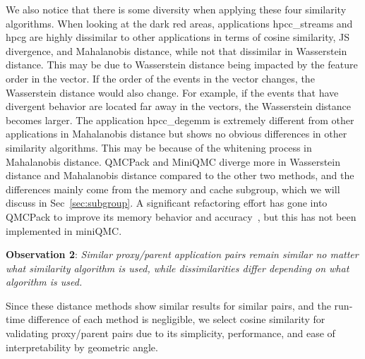 We also notice that there is some diversity when applying these four similarity algorithms. When looking at the dark red areas, applications hpcc\_streams and hpcg are highly dissimilar to other applications in terms of cosine similarity, JS divergence, and Mahalanobis distance, while not that dissimilar in Wasserstein distance. This may be due to Wasserstein distance being impacted by the feature order in the vector. If the order of the events in the vector changes, the Wasserstein distance would also change. For example, if the events that have divergent behavior are located far away in the vectors, the Wasserstein distance becomes larger. The application hpcc\_degemm is extremely different from other applications in Mahalanobis distance but shows no obvious differences in other similarity algorithms. This may be because of the whitening process in Mahalanobis distance. QMCPack and MiniQMC diverge more in Wasserstein distance and Mahalanobis distance compared to the other two methods, and the differences mainly come from the memory and cache subgroup, which we will discuss in Sec~\ref{sec:subgroup}. A significant refactoring effort has gone into QMCPack to improve its memory
behavior and accuracy~\cite{qmcpack}, but this has not been implemented in miniQMC.
\begin{mdframed}
\textbf{Observation 2}: \textit{Similar proxy/parent application pairs remain similar no matter what similarity algorithm is used, while dissimilarities differ depending on what algorithm is used.}\end{mdframed}

Since these distance methods show similar results for similar pairs, and the run-time difference of each method is negligible, we select cosine similarity for validating proxy/parent pairs due to its simplicity, performance, and ease of interpretability by geometric angle.

